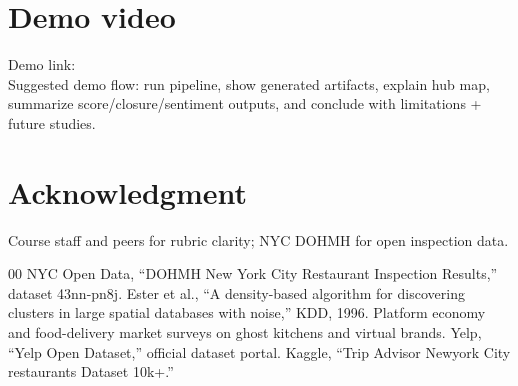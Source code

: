 \documentclass[10pt,twocolumn]{article}
\begin{document}
\section*{Demo video}
Demo link: \\
Suggested demo flow: run pipeline, show generated artifacts, explain hub map, summarize score/closure/sentiment outputs, and conclude with limitations + future studies.

\section*{Acknowledgment}
Course staff and peers for rubric clarity; NYC DOHMH for open inspection data.

\begin{thebibliography}{00}
 NYC Open Data, ``DOHMH New York City Restaurant Inspection Results,'' dataset 43nn-pn8j.
 Ester et al., ``A density-based algorithm for discovering clusters in large spatial databases with noise,'' KDD, 1996.
 Platform economy and food-delivery market surveys on ghost kitchens and virtual brands.
 Yelp, ``Yelp Open Dataset,'' official dataset portal.
 Kaggle, ``Trip Advisor Newyork City restaurants Dataset 10k+.''
\end{thebibliography}
\end{document}
